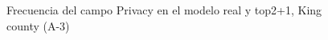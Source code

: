 \begin{figure}[H]
    \centering
    
    \caption{Frecuencia del campo Privacy en el modelo real y top2+1, King county (A-3)}
    \label{frecuency-top2+1-privacy}
\end{figure}